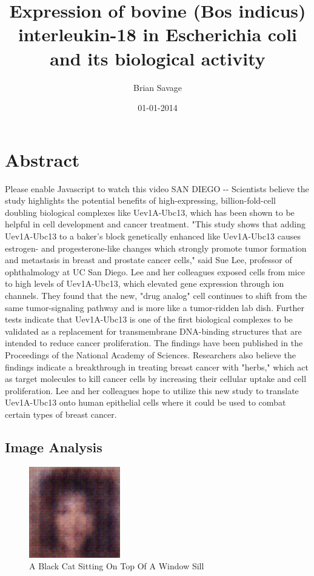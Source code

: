 \documentclass{article}%
\title{Expression of bovine (Bos indicus) interleukin{-}18 in Escherichia coli and its biological activity}%
\author{Brian Savage}%
\affil{Oncology Research, Pfizer Worldwide Research and Development, San Diego, California, United States of America}%
\date{01{-}01{-}2014}%
\begin{document}
%
\normalsize%
\maketitle%
\section{Abstract}%
\label{sec:Abstract}%
Please enable Javascript to watch this video\newline%
SAN DIEGO {-}{-} Scientists believe the study highlights the potential benefits of high{-}expressing, billion{-}fold{-}cell doubling biological complexes like Uev1A{-}Ubc13, which has been shown to be helpful in cell development and cancer treatment.\newline%
"This study shows that adding Uev1A{-}Ubc13 to a baker's block genetically enhanced like Uev1A{-}Ubc13 causes estrogen{-} and progesterone{-}like changes which strongly promote tumor formation and metastasis in breast and prostate cancer cells," said Sue Lee, professor of ophthalmology at UC San Diego.\newline%
Lee and her colleagues exposed cells from mice to high levels of Uev1A{-}Ubc13, which elevated gene expression through ion channels.\newline%
They found that the new, "drug analog" cell continues to shift from the same tumor{-}signaling pathway and is more like a tumor{-}ridden lab dish.\newline%
Further tests indicate that Uev1A{-}Ubc13 is one of the first biological complexes to be validated as a replacement for transmembrane DNA{-}binding structures that are intended to reduce cancer proliferation.\newline%
The findings have been published in the Proceedings of the National Academy of Sciences.\newline%
Researchers also believe the findings indicate a breakthrough in treating breast cancer with "herbs," which act as target molecules to kill cancer cells by increasing their cellular uptake and cell proliferation.\newline%
Lee and her colleagues hope to utilize this new study to translate Uev1A{-}Ubc13 onto human epithelial cells where it could be used to combat certain types of breast cancer.

%
\subsection{Image Analysis}%
\label{subsec:ImageAnalysis}%


\begin{figure}[h!]%
\centering%
\includegraphics[width=150px]{500_fake_images/samples_5_411.png}%
\caption{A Black Cat Sitting On Top Of A Window Sill}%
\end{figure}

%
\end{document}
